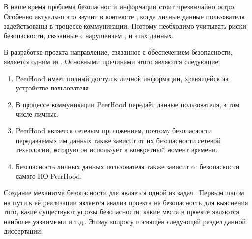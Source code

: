 %
В наше время проблема безопасности информации стоит чрезвычайно остро.
%
Особенно актуально это звучит в контексте , когда личные данные пользователя задействованы в процессе коммуникации.
%
Поэтому необходимо учитывать риски безопасности, связанные с нарушением ,  и  этих данных.

%
В разработке проекта  направление, связанное с обеспечением безопасности, является одним из  . 
%
Основными причинами этого являются следующие:
\begin{enumerate}

	\item PeerHood имеет полный доступ к личной информации, хранящейся на устройстве пользователя.

	\item В процессе коммуникации PeerHood передаёт данные пользователя, в том числе личные.

	\item PeerHood является сетевым приложением, поэтому безопасности передаваемых им данных также зависит от их безопасности сетевой технологии, которую он использует в конкретный момент времени.

	\item Безопасность личных данных пользователя также зависит от безопасности самого ПО PeerHood.
\end{enumerate}

%
Создание механизма безопасности для  является одной из  задач .
%
Первым шагом на пути к её реализации является анализ проекта на безопасность для выяснения того, какие существуют угрозы безопасности, какие места в проекте являются наиболее уязвимыми и т.д..
%
Этому вопросу посвящён следующий раздел данной диссертации.
